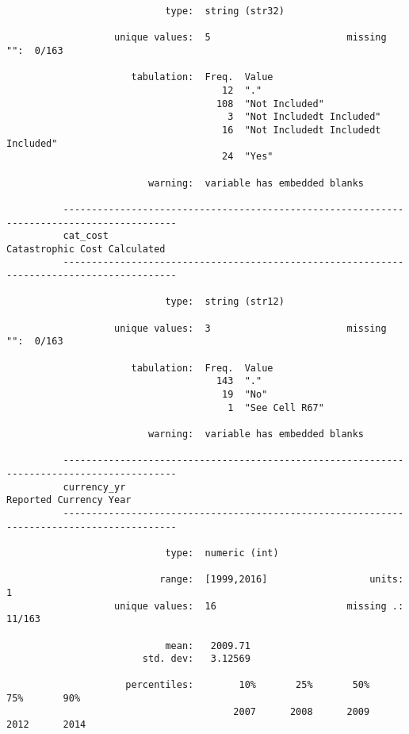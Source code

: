 \documentclass{article}
\begin{document}
\begin{verbatim}
                            type:  string (str32)
          
                   unique values:  5                        missing "":  0/163
          
                      tabulation:  Freq.  Value
                                      12  "."
                                     108  "Not Included"
                                       3  "Not Includedt Included"
                                      16  "Not Includedt Includedt Included"
                                      24  "Yes"
          
                         warning:  variable has embedded blanks
          
          ------------------------------------------------------------------------------------------
          cat_cost                                                      Catastrophic Cost Calculated
          ------------------------------------------------------------------------------------------
          
                            type:  string (str12)
          
                   unique values:  3                        missing "":  0/163
          
                      tabulation:  Freq.  Value
                                     143  "."
                                      19  "No"
                                       1  "See Cell R67"
          
                         warning:  variable has embedded blanks
          
          ------------------------------------------------------------------------------------------
          currency_yr                                                         Reported Currency Year
          ------------------------------------------------------------------------------------------
          
                            type:  numeric (int)
          
                           range:  [1999,2016]                  units:  1
                   unique values:  16                       missing .:  11/163
          
                            mean:   2009.71
                        std. dev:   3.12569
          
                     percentiles:        10%       25%       50%       75%       90%
                                        2007      2008      2009      2012      2014
          

\end{verbatim}
\end{document}

